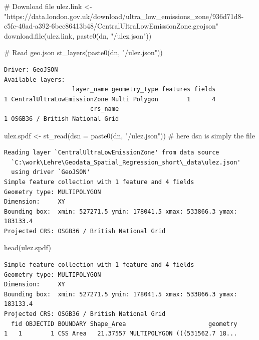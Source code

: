 \documentclass[
  letterpaper,
  DIV=11,
  numbers=noendperiod]{scrreprt}
\newenvironment{Shaded}{\begin{snugshade}}{\end{snugshade}}
\newcommand{\AttributeTok}[1]{\textcolor[rgb]{0.40,0.45,0.13}{#1}}
\newcommand{\CommentTok}[1]{\textcolor[rgb]{0.37,0.37,0.37}{#1}}
\newcommand{\FunctionTok}[1]{\textcolor[rgb]{0.28,0.35,0.67}{#1}}
\newcommand{\NormalTok}[1]{\textcolor[rgb]{0.00,0.23,0.31}{#1}}
\newcommand{\OtherTok}[1]{\textcolor[rgb]{0.00,0.23,0.31}{#1}}
\newcommand{\StringTok}[1]{\textcolor[rgb]{0.13,0.47,0.30}{#1}}
\begin{document}
\begin{Shaded}
\begin{Highlighting}[]
\CommentTok{\# Download file}
\NormalTok{ulez.link }\OtherTok{\textless{}{-}} \StringTok{"https://data.london.gov.uk/download/ultra\_low\_emissions\_zone/936d71d8{-}c5fc{-}40ad{-}a392{-}6bec86413b48/CentralUltraLowEmissionZone.geojson"}
\FunctionTok{download.file}\NormalTok{(ulez.link, }\FunctionTok{paste0}\NormalTok{(dn, }\StringTok{"/ulez.json"}\NormalTok{))}

\CommentTok{\# Read geo.json}
\FunctionTok{st\_layers}\NormalTok{(}\FunctionTok{paste0}\NormalTok{(dn, }\StringTok{"/ulez.json"}\NormalTok{))}
\end{Highlighting}
\end{Shaded}

\begin{verbatim}
Driver: GeoJSON 
Available layers:
                   layer_name geometry_type features fields
1 CentralUltraLowEmissionZone Multi Polygon        1      4
                        crs_name
1 OSGB36 / British National Grid
\end{verbatim}

\begin{Shaded}
\begin{Highlighting}[]
\NormalTok{ulez.spdf }\OtherTok{\textless{}{-}} \FunctionTok{st\_read}\NormalTok{(}\AttributeTok{dsn =} \FunctionTok{paste0}\NormalTok{(dn, }\StringTok{"/ulez.json"}\NormalTok{)) }\CommentTok{\# here dsn is simply the file}
\end{Highlighting}
\end{Shaded}

\begin{verbatim}
Reading layer `CentralUltraLowEmissionZone' from data source 
  `C:\work\Lehre\Geodata_Spatial_Regression_short\_data\ulez.json' 
  using driver `GeoJSON'
Simple feature collection with 1 feature and 4 fields
Geometry type: MULTIPOLYGON
Dimension:     XY
Bounding box:  xmin: 527271.5 ymin: 178041.5 xmax: 533866.3 ymax: 183133.4
Projected CRS: OSGB36 / British National Grid
\end{verbatim}

\begin{Shaded}
\begin{Highlighting}[]
\FunctionTok{head}\NormalTok{(ulez.spdf)}
\end{Highlighting}
\end{Shaded}

\begin{verbatim}
Simple feature collection with 1 feature and 4 fields
Geometry type: MULTIPOLYGON
Dimension:     XY
Bounding box:  xmin: 527271.5 ymin: 178041.5 xmax: 533866.3 ymax: 183133.4
Projected CRS: OSGB36 / British National Grid
  fid OBJECTID BOUNDARY Shape_Area                       geometry
1   1        1 CSS Area   21.37557 MULTIPOLYGON (((531562.7 18...
\end{verbatim}
\end{document}
